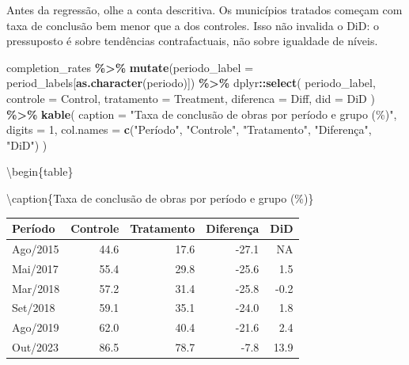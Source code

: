 \documentclass[
]{article}
\newenvironment{Shaded}{\begin{snugshade}}{\end{snugshade}}
\newcommand{\AttributeTok}[1]{\textcolor[rgb]{0.13,0.29,0.53}{#1}}
\newcommand{\DecValTok}[1]{\textcolor[rgb]{0.00,0.00,0.81}{#1}}
\newcommand{\FunctionTok}[1]{\textcolor[rgb]{0.13,0.29,0.53}{\textbf{#1}}}
\newcommand{\NormalTok}[1]{#1}
\newcommand{\SpecialCharTok}[1]{\textcolor[rgb]{0.81,0.36,0.00}{\textbf{#1}}}
\newcommand{\StringTok}[1]{\textcolor[rgb]{0.31,0.60,0.02}{#1}}
\begin{document}
Antes da regressão, olhe a conta descritiva. Os municípios tratados começam com taxa de conclusão bem menor que a dos controles. Isso não invalida o DiD: o pressuposto é sobre tendências contrafactuais, não sobre igualdade de níveis.

\begin{Shaded}
\begin{Highlighting}[]
\NormalTok{completion\_rates }\SpecialCharTok{\%\textgreater{}\%}
  \FunctionTok{mutate}\NormalTok{(}\AttributeTok{periodo\_label =}\NormalTok{ period\_labels[}\FunctionTok{as.character}\NormalTok{(periodo)]) }\SpecialCharTok{\%\textgreater{}\%}
\NormalTok{  dplyr}\SpecialCharTok{::}\FunctionTok{select}\NormalTok{(}
\NormalTok{    periodo\_label,}
    \AttributeTok{controle =}\NormalTok{ Control,}
    \AttributeTok{tratamento =}\NormalTok{ Treatment,}
    \AttributeTok{diferenca =}\NormalTok{ Diff,}
    \AttributeTok{did =}\NormalTok{ DiD}
\NormalTok{  ) }\SpecialCharTok{\%\textgreater{}\%}
  \FunctionTok{kable}\NormalTok{(}
    \AttributeTok{caption =} \StringTok{"Taxa de conclusão de obras por período e grupo (\%)"}\NormalTok{,}
    \AttributeTok{digits =} \DecValTok{1}\NormalTok{,}
    \AttributeTok{col.names =} \FunctionTok{c}\NormalTok{(}\StringTok{"Período"}\NormalTok{, }\StringTok{"Controle"}\NormalTok{, }\StringTok{"Tratamento"}\NormalTok{, }\StringTok{"Diferença"}\NormalTok{, }\StringTok{"DiD"}\NormalTok{)}
\NormalTok{  )}
\end{Highlighting}
\end{Shaded}

\textbackslash begin\{table\}

\textbackslash caption\{\label{tab:ot-completion-rates}Taxa de conclusão de obras por período e grupo (\%)\}
\centering

\begin{tabular}[t]{l|r|r|r|r}
\hline
Período & Controle & Tratamento & Diferença & DiD\\
\hline
Ago/2015 & 44.6 & 17.6 & -27.1 & NA\\
\hline
Mai/2017 & 55.4 & 29.8 & -25.6 & 1.5\\
\hline
Mar/2018 & 57.2 & 31.4 & -25.8 & -0.2\\
\hline
Set/2018 & 59.1 & 35.1 & -24.0 & 1.8\\
\hline
Ago/2019 & 62.0 & 40.4 & -21.6 & 2.4\\
\hline
Out/2023 & 86.5 & 78.7 & -7.8 & 13.9\\
\hline
\end{tabular}
\end{document}
